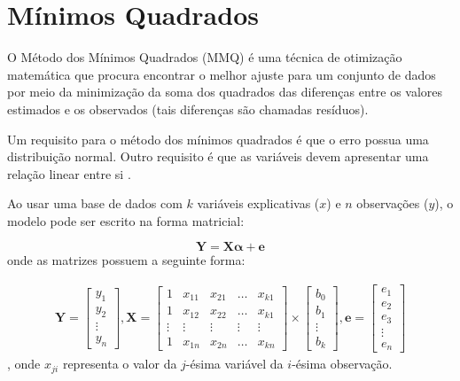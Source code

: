 \section{Mínimos Quadrados}
\label{sec:MMQ}

O Método dos Mínimos Quadrados (MMQ) é uma técnica de otimização matemática que procura encontrar o melhor ajuste para um conjunto de dados por meio da minimização da soma dos quadrados das diferenças entre os valores estimados e os observados (tais diferenças são chamadas resíduos).

Um requisito para o método dos mínimos quadrados é que o erro possua uma distribuição normal. Outro requisito é que as variáveis devem apresentar uma relação linear entre si \cite{MMQ}.

Ao usar uma base de dados com $k$ variáveis explicativas ($x$) e $n$ observações ($y$), o modelo pode ser escrito na forma matricial:


\begin{equation}
    \bm{Y} = \bm{X\alpha{} + e}
\end{equation}
onde as matrizes possuem a seguinte forma:

\begin{align*}
    \bm{Y} =
    \begin{bmatrix}
        y_1\\
        y_2\\
        \vdots\\
        y_n
    \end{bmatrix},
    \bm{X} = 
    \begin{bmatrix}
        1 & x_{11} & x_{21} & \hdots & x_{k1} \\
        1 & x_{12} & x_{22} & \hdots & x_{k1} \\
        \vdots & \vdots & \vdots & \vdots & \vdots \\
        1 & x_{1n} & x_{2n} & \hdots & x_{kn}
    \end{bmatrix} \times 
    \begin{bmatrix}
        b_0\\
        b_1\\
        \vdots\\
        b_k
    \end{bmatrix},
    \bm{e} = 
    \begin{bmatrix}
        e_1\\
        e_2\\
        e_3\\
        \vdots\\
        e_n
    \end{bmatrix}
\end{align*}
, onde $x_{ji}$ representa o valor da $j$-ésima variável da $i$-ésima observação.

